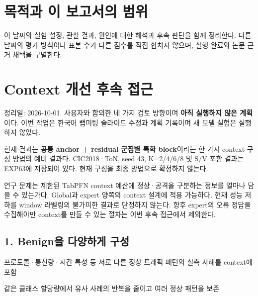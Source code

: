 




\section*{목적과 이 보고서의 범위}

이 날짜의 실험 설정, 관찰 결과, 원인에 대한 해석과 후속 판단을 함께 정리한다. 다른 날짜의 평가 방식이나 표본 수가 다른 점수를 직접 합치지 않으며, 실행 완료와 논문 근거 채택을 구별한다.


\section{Context 개선 후속 접근}
정리일: 2026-10-01. 사용자와 합의한 네 가지 검토 방향이며 \textbf{아직 실행하지 않은 계획}이다. 이번 작업은 한국어 랩미팅 슬라이드 수정과 계획 기록이며 새 모델 실험은 실행하지 않았다.

현재 결과는 \textbf{공통 anchor +\allowbreak{} residual 군집별 특화 block}이라는 한 가지 context 구성 방법의 예비 결과다. CIC2018·ToN, seed 43, K=\allowbreak{}2/\allowbreak{}4/\allowbreak{}6/\allowbreak{}8 및 S/\allowbreak{}V 포함 결과는 EXP63에 저장되어 있다. 현재 구성을 최종 방법으로 확정하지 않는다.

연구 문제는 제한된 TabPFN context 예산에 정상·공격을 구분하는 정보를 얼마나 담을 수 있는가다. Global과 expert 양쪽의 context 설계에 적용 가능하다. 현재 성능 저하를 window 라벨링의 불가피한 결과로 단정하지 않는다. 향후 expert의 오류 정답을 수집해야만 context를 만들 수 있는 절차는 이번 후속 접근에서 제외한다.

\subsection{1. Benign을 다양하게 구성}
\par\noindent \textbullet\enspace 프로토콜·통신량·시간 특성 등 서로 다른 정상 트래픽 패턴의 실측 사례를 context에 포함


\par\noindent \textbullet\enspace 같은 클래스 할당량에서 유사 사례의 반복을 줄이고 여러 정상 패턴을 보존


